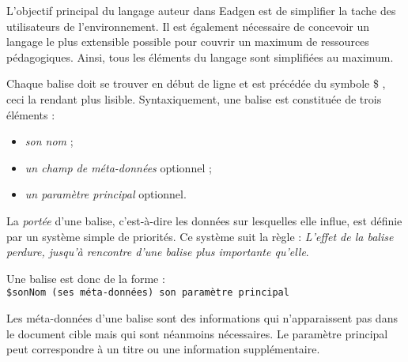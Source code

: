 L'objectif principal du langage auteur dans Eadgen est de simplifier
la tache des utilisateurs de l'environnement. Il
est également nécessaire de concevoir un langage le plus extensible possible
pour couvrir un maximum de ressources pédagogiques.
Ainsi, tous les éléments du langage sont simplifiées au maximum.

Chaque balise doit se trouver en début de ligne et est précédée
du symbole \og \$ \fg, ceci la rendant plus lisible. Syntaxiquement, une
balise est constituée de trois éléments :
\begin{itemize}
	\item \emph{son nom} ;
	\item \emph{un champ de méta-données} optionnel ;
	\item \emph{un paramètre principal} optionnel.
\end{itemize}
La \emph{portée} d'une balise, c'est-à-dire les données sur lesquelles
elle influe, est définie par un système simple de priorités. Ce système
suit la règle : \emph{L'effet de la
balise perdure, jusqu'à rencontre d'une balise plus importante qu'elle}.

Une balise est donc de la forme : \\
\texttt{\$sonNom (ses méta-données) son paramètre principal}

Les méta-données d'une balise sont des informations qui n'apparaissent
pas dans le document cible mais qui sont néanmoins nécessaires. Le paramètre
principal peut correspondre à un titre ou une information supplémentaire.
